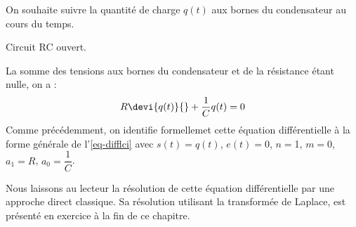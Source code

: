 On souhaite suivre la quantité de charge $q(t)$ aux bornes du condensateur au 
cours du temps.
\begin{marginfigure}[-8em]   
    \centering
    
    \caption{Circuit RC ouvert.\label{fig-decharge_condensateur}}
\end{marginfigure}
La somme des tensions aux bornes du condensateur et de la résistance 
étant nulle, on a :
\begin{align*}
    R\devi{q(t)}{}+\dfrac{1}{C}q(t)=0 
\end{align*}
Comme précédemment, on identifie formellemet cette équation différentielle 
à la forme générale de l'\cref{eq-difflci} avec $s(t)=q(t)$, $e(t)=0$, 
$n=$1, $m=0$, $a_1=R$, $a_0=\dfrac{1}{C}$.

Nous laissons au lecteur la résolution de cette équation différentielle 
par une approche direct classique. Sa résolution utilisant la transformée 
de Laplace, est présenté en exercice à la fin de ce chapitre.
